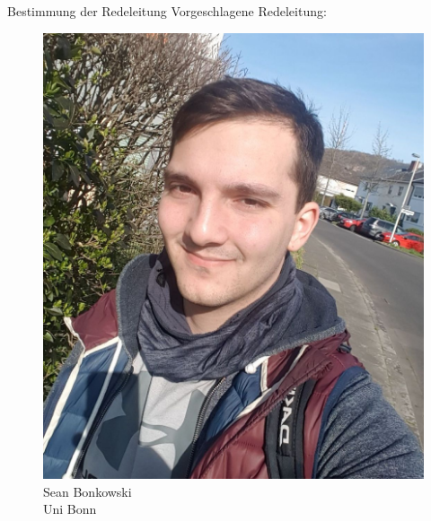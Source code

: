 \documentclass[compress, aspectratio=169]{beamer}
\begin{document}
	\begin{frame}{Bestimmung der Redeleitung}
		\centering
		Vorgeschlagene Redeleitung:
		\vspace{.5cm}
		
		\hspace{0.1\textwidth}
		\begin{minipage}{.3\textwidth}
			\begin{figure}
				\begin{minipage}[c]{.655\textwidth}
					\includegraphics[height=0.5\textheight]{sean.jpg}
				\end{minipage} \hfill
				\begin{minipage}[c]{.632\textwidth}
					\caption*{Sean Bonkowski \\ Uni Bonn}
				\end{minipage}
			\end{figure}
		\end{minipage}
		\hspace{0.1\textwidth}
		\begin{minipage}{0.4\textwidth}
			\begin{figure}
				\begin{minipage}[c]{.65\textwidth}

\end{minipage}
\end{figure}
\end{minipage}
\end{frame}
\end{document}
